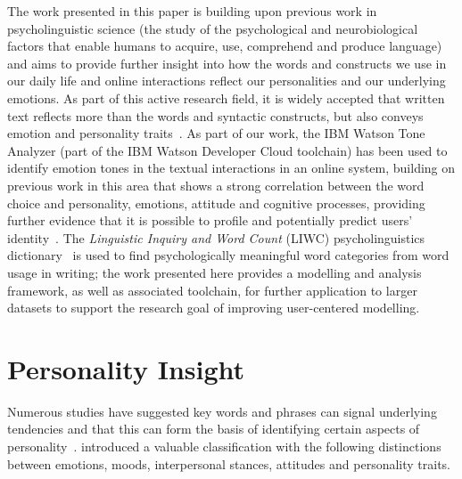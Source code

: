 \documentclass[graybox]{svmult}
\begin{document}

The work presented in this paper is building upon previous work in
psycholinguistic science (the study of the psychological and
neurobiological factors that enable humans to acquire, use, comprehend
and produce language) and aims to provide further insight into how the
words and constructs we use in our daily life and online interactions
reflect our personalities and our underlying emotions. As part of this
active research field, it is widely accepted that written text
reflects more than the words and syntactic constructs, but also
conveys emotion and personality
traits~\citep{pennebaker+king:1999}. As part of our work, the IBM
Watson Tone Analyzer (part of the IBM Watson Developer Cloud
toolchain) has been used to identify emotion tones in the textual
interactions in an online system, building on previous work in this
area that shows a strong correlation between the word choice and
personality, emotions, attitude and cognitive processes, providing
further evidence that it is possible to profile and potentially
predict users’ identity~\citep{fast+funder:2008}. The
{\emph{Linguistic Inquiry and Word Count}} (LIWC) psycholinguistics
dictionary~\citep{pennebaker-et-al:2001,tausczik+pennebaker:2010} is
used to find psychologically meaningful word categories from word
usage in writing; the work presented here provides a modelling and
analysis framework, as well as associated toolchain, for further
application to larger datasets to support the research goal of
improving user-centered modelling.


\section{Personality Insight}\label{personality}

Numerous studies have suggested key words and phrases can signal
underlying tendencies and that this can form the basis of identifying
certain aspects of
personality~\citep{iacobelli-et-al:2011,pennebaker+king:1999,oberlander+gill:2004,oberlander+gill:2006}.
\citet{scherer:1984} introduced a valuable classification with the
following distinctions between emotions, moods, interpersonal stances,
attitudes and personality traits.
\end{document}
